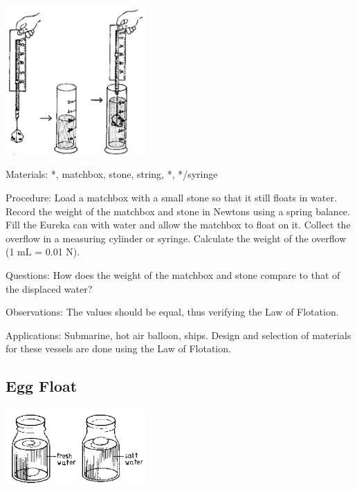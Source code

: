 \begin{multicols}{2}
\begin{center}
\includegraphics[width=0.4\textwidth]{./img/source/upthrust.png}
\end{center}

\begin{description*}
\item[Materials:]{*, matchbox, stone, string, *, */syringe}
\item[Procedure:]{Load a matchbox with a small stone so that it still floats in water. Record the weight of the matchbox and stone in Newtons using a spring balance. Fill the Eureka can with water and allow the matchbox to float on it. Collect the overflow in a measuring cylinder or syringe. Calculate the weight of the overflow (1 mL = 0.01 N).}
\item[Questions:]{How does the weight of the matchbox and stone compare to that of the displaced water?}
\item[Observations:]{The values should be equal, thus verifying the Law of Flotation.}
\item[Applications:]{Submarine, hot air balloon, ships. Design and selection of materials for these vessels are done using the Law of Flotation.}
\end{description*}

\subsection{Egg Float}

\begin{center}
\includegraphics[width=0.4\textwidth]{./img/source/egg-float.png}
\end{center}


\end{multicols}
